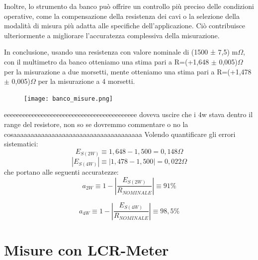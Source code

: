 Inoltre, lo strumento da banco può offrire un controllo più preciso delle condizioni operative, come la compensazione della resistenza dei cavi o la selezione della modalità di misura più adatta alle specifiche dell'applicazione. Ciò contribuisce ulteriormente a migliorare l'accuratezza complessiva della misurazione.

In conclusione, usando una resistenza con valore nominale di (1500 ± 7,5) m$\Omega$, con il multimetro da banco otteniamo una stima pari a R=(+1,648 $\pm$ 0,005)$\Omega$ per la misurazione a due morsetti, mente otteniamo una stima pari a R=(+1,478 $\pm$ 0,005)$\Omega$ per la misurazione a 4 morsetti.

\begin{figure}[h]
    \centering
    \texttt{[image: banco\_misure.png]}
    \label{fig:range}
\end{figure}

eeeeeeeeeeeeeeeeeeeeeeeeeeeeeeeeeeeeeeeeeee doveva uscire che i 4w stava dentro il range del resistore, non so se dovremmo commentare o no la cosaaaaaaaaaaaaaaaaaaaaaaaaaaaaaaaaaaaaa
\newline
Volendo quantificare gli errori sistematici:
\begin{equation}
    E_{S(2W)} \equiv 1,648 - 1,500 = 0,148 \Omega
\end{equation}
\begin{equation}
    | E_{S(4W)} | \equiv | 1,478 - 1,500  |= 0,022 \Omega
\end{equation}
che portano alle seguenti accuratezze: 
\begin{equation}
    a_{2W} \equiv 1 - \left| \frac{E_{S(2W)}}{R_{NOMINALE}} \right| \equiv 91\%
\end{equation}

\begin{equation}
    a_{4W} \equiv 1 - \left| \frac{E_{S(4W)}}{R_{NOMINALE}} \right| \equiv 98,5\%
\end{equation}















\section{Misure con LCR-Meter}
\label{sec:lcr}

